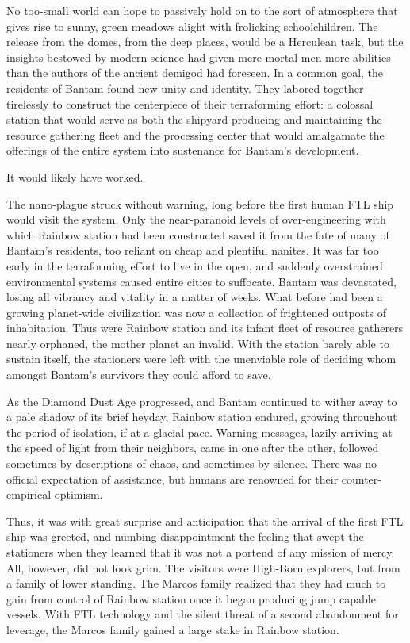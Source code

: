 No too-small world can hope to passively hold on to the sort of
atmosphere that gives rise to sunny, green meadows alight with
frolicking schoolchildren. The release from the domes, from the deep
places, would be a Herculean task, but the insights bestowed by modern
science had given mere mortal men more abilities than the authors of
the ancient demigod had foreseen. In a common goal, the residents of
Bantam found new unity and identity. They labored together tirelessly
to construct the centerpiece of their terraforming effort: a colossal
station that would serve as both the shipyard producing and
maintaining the resource gathering fleet and the processing center
that would amalgamate the offerings of the entire system into
sustenance for Bantam's development.

It would likely have worked. 

The nano-plague struck without warning, long before the first human
FTL ship would visit the system. Only the near-paranoid levels of
over-engineering with which Rainbow station had been constructed saved
it from the fate of many of Bantam's residents, too reliant on cheap
and plentiful nanites. It was far too early in the terraforming effort
to live in the open, and suddenly overstrained environmental systems
caused entire cities to suffocate. Bantam was devastated, losing all
vibrancy and vitality in a matter of weeks. What before had been a
growing planet-wide civilization was now a collection of frightened
outposts of inhabitation. Thus were Rainbow station and its infant
fleet of resource gatherers nearly orphaned, the mother planet an
invalid. With the station barely able to sustain itself, the
stationers were left with the unenviable role of deciding whom amongst
Bantam's survivors they could afford to save.

As the Diamond Dust Age progressed, and Bantam continued to wither
away to a pale shadow of its brief heyday, Rainbow station endured,
growing throughout the period of isolation, if at a glacial
pace. Warning messages, lazily arriving at the speed of light from
their neighbors, came in one after the other, followed sometimes by
descriptions of chaos, and sometimes by silence. There was no official
expectation of assistance, but humans are renowned for their
counter-empirical optimism.

Thus, it was with great surprise and anticipation that the arrival of
the first FTL ship was greeted, and numbing disappointment the feeling
that swept the stationers when they learned that it was not a portend
of any mission of mercy. All, however, did not look grim. The visitors
were High-Born explorers, but from a family of lower standing. The
Marcos family realized that they had much to gain from control of
Rainbow station once it began producing jump capable vessels. With FTL
technology and the silent threat of a second abandonment for leverage,
the Marcos family gained a large stake in Rainbow station.

